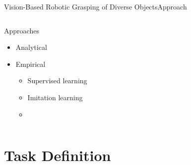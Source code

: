 \begin{frame}{Vision-Based Robotic Grasping of Diverse Objects}{Approach}
    \begin{columns}%
        \begin{column}{0.375\textwidth}%
            \begin{block}{Approaches}
                \begin{itemize}
                    \item Analytical
                    \item Empirical
                          \begin{itemize}
                              \item Supervised learning
                              \item Imitation learning
                              \item {}
                          \end{itemize}
                \end{itemize}
            \end{block}
        \end{column}
        \begin{column}{0.625\textwidth}%
            \centering
        \end{column}
    \end{columns}
\end{frame}


\section{Task Definition}

